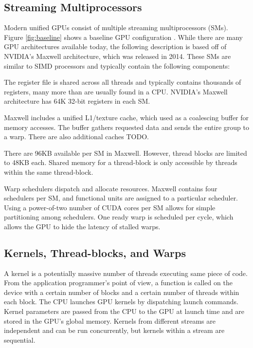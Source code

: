 \documentclass[prodmode,acmtecs]{acmsmall} %
\begin{document}
\subsection{Streaming Multiprocessors}
Modern unified GPUs consist of multiple streaming multiprocessors (SMs). Figure
\ref{fig:baseline} shows a baseline GPU configuration
\cite{DynamicThreadBlockLaunch}. While there are many GPU architectures
available today, the following description is based off of NVIDIA's Maxwell
architecture, which was released in 2014. These SMs are similar to SIMD
processors and typically contain the following components:
\begin{description}
  \setlength\itemsep{0.5em}
  \item[A large register file] The register file is shared across all threads
  and typically contains thousands of registers, many more than are usually
  found in a CPU. NVIDIA's Maxwell architecture has 64K 32-bit registers in each
  SM.
  \item[Multiple caches] Maxwell includes a unified L1/texture cache, which used
  as a coalescing buffer for memory accesses. The buffer gathers requested data
  and sends the entire group to a warp. There are also additional caches TODO.
  \item[Shared memory] There are 96KB available per SM in Maxwell. However,
  thread blocks are limited to 48KB each. Shared memory for a thread-block is
  only accessible by threads within the same thread-block.
  \item[Multiple warp schedulers] Warp schedulers dispatch and allocate
  resources. Maxwell contains four schedulers per SM, and functional units are
  assigned to a particular scheduler. Using a power-of-two number of CUDA cores
  per SM allows for simple partitioning among schedulers. One ready warp is
  scheduled per cycle, which allows the GPU to hide the latency of stalled
  warps.
\end{description}

\subsection{Kernels, Thread-blocks, and Warps}
A kernel is a potentially massive number of threads executing same piece of
code. From the application programmer's point of view, a function is called on
the device with a certain number of blocks and a certain number of threads
within each block. The CPU launches GPU kernels by dispatching launch commands.
Kernel parameters are passed from the CPU to the GPU at launch time and are
stored in the GPU's global memory. Kernels from different streams are
independent and can be run concurrently, but kernels within a stream are
sequential.
\end{document}
